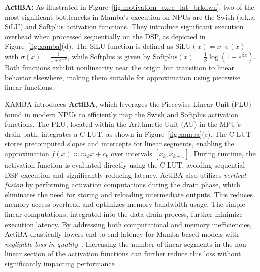 \textbf{ActiBA:}  
As illustrated in Figure~\ref{fig:motivation_exec_lat_brkdwn}, two of the most significant bottlenecks in Mamba’s execution on NPUs are the Swish (a.k.a. SiLU) and Softplus activation functions. They introduce significant execution overhead when processed sequentially on the DSP, as depicted in Figure~\ref{fig:xamba}(d). 
The SiLU function is defined as $\text{SiLU}(x) = x \cdot \sigma(x)$ with $\sigma(x) = \frac{1}{1 + e^{-x}}$, while Softplus is given by $\text{Softplus}(x) = \frac{1}{\beta} \log (1 + e^{\beta x})$. Both functions exhibit nonlinearity near the origin but transition to linear behavior elsewhere, making them suitable for approximation using piecewise linear functions.

XAMBA introduces \textbf{ActiBA}, which leverages the Piecewise Linear Unit (PLU) found in modern NPUs to efficiently map the Swish and Softplus activation functions. The PLU, located within the Arithmetic Unit (AU) in the MPU's drain path, integrates a C-LUT, as shown in Figure~\ref{fig:xamba}(e).
The C-LUT stores precomputed slopes and intercepts for linear segments, enabling the approximation $f(x) \approx m_k x + c_k$ over intervals $[x_k, x_{k+1}]$. During runtime, the activation function is evaluated directly using the C-LUT, avoiding sequential DSP execution and significantly reducing latency. ActiBA also utilizes \textit{vertical fusion} by performing activation computations during the drain phase, which eliminates the need for storing and reloading intermediate outputs. This reduces memory access overhead and optimizes memory bandwidth usage. The simple linear computations, integrated into the data drain process, further minimize execution latency. By addressing both computational and memory inefficiencies, ActiBA drastically lowers end-to-end latency for Mamba-based models with \textit{negligible loss in quality}~\cite{dse_act}. Increasing the number of linear segments in the non-linear section of the activation functions can further reduce this loss without significantly impacting performance~\cite{flex_sfu}.

